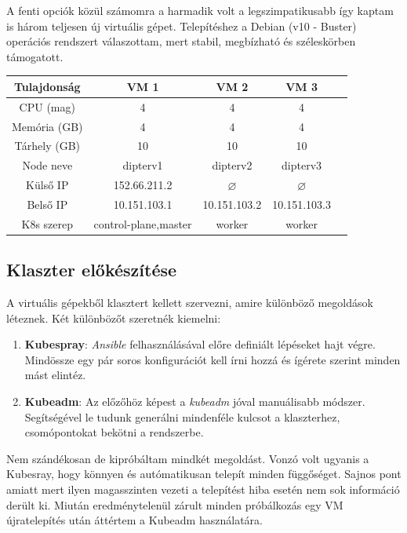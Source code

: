 A fenti opciók közül számomra a harmadik volt a legszimpatikusabb így kaptam is három teljesen új virtuális gépet. Telepítéshez a Debian (v10 - Buster) operációs rendszert válaszottam, mert stabil, megbízható és széleskörben támogatott. 

\begin{center}
\begin{tabular}{ c||cccc| } 
\hline 
Tulajdonság & VM 1 & VM 2 & VM 3 \\
\hline \hline
CPU (mag) & 4 & 4 & 4 \\ 
Memória (GB) & 4 & 4 & 4 \\
Tárhely (GB) & 10 & 10 & 10 \\  
Node neve & dipterv1 & dipterv2 & dipterv3 \\ 
Külső IP & 152.66.211.2 & $\varnothing$ & $\varnothing$ \\ 
Belső IP & 10.151.103.1 & 10.151.103.2 & 10.151.103.3 \\
K8s szerep& control-plane,master & worker & worker \\
\hline
\end{tabular}
\end{center}

\subsection{Klaszter előkészítése}
A virtuális gépekből klasztert kellett szervezni, amire különböző megoldások léteznek.\citep{kubernetesInstall} Két különbözőt szeretnék kiemelni:
\begin{enumerate}
  \item \textbf{Kubespray}: \textit{Ansible} felhasználásával előre definiált lépéseket hajt végre. Mindössze egy pár soros konfigurációt kell írni hozzá és ígérete szerint minden mást elintéz.
  \item \textbf{Kubeadm}: Az előzőhöz képest a \textit{kubeadm} jóval manuálisabb módszer. Segítségével le tudunk generálni mindenféle kulcsot a klaszterhez, csomópontokat bekötni a rendszerbe.
\end{enumerate}

Nem szándékosan de kipróbáltam mindkét megoldást. Vonzó volt ugyanis a Kubesray, hogy könnyen és autómatikusan telepít minden függőséget. Sajnos pont amiatt mert ilyen magasszinten vezeti a telepítést hiba esetén nem sok információ derült ki. Miután eredménytelenül zárult minden próbálkozás egy VM újratelepítés után áttértem a Kubeadm használatára. 

